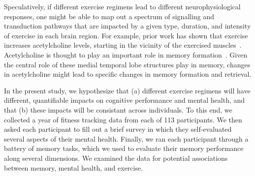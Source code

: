 \documentclass[10pt]{article}
\begin{document}
Speculatively, if different exercise regimens lead to different
neurophysiological responses, one might be able to map out a spectrum
of signalling and transduction pathways that are impacted by a given
type, duration, and intensity of exercise in each brain region.  For
example, prior work has shown that exercise increases acetylcholine
levels, starting in the vicinity of the exercised
muscles~\citep{ShoeEtal97}.  Acetylcholine is thought to play an
important role in memory formation~\citep[e.g., by modulating specific
synaptic inputs from entorhinal cortex to the hippocampus, albeit in
rodents;]{PalaEtal21}.  Given the central role of these medial
temporal lobe structures play in memory, changes in acetylcholine
might lead to specific changes in memory formation and retrieval.

In the present study, we hypothesize that (a) different exercise regimens will
have different, quantifiable impacts on cognitive performance and
mental health, and that (b) these impacts will be consistant across
individuals.  To this end, we collected a year of fitness tracking
data from each of 113 participants.  We then asked each participant to
fill out a brief survey in which they self-evaluated several aspects
of their mental health.  Finally, we ran each participant through a
battery of memory tasks, which we used to evaluate their memory
performance along several dimensions.  We examined the data for
potential associations between memory, mental health, and exercise.
\end{document}
